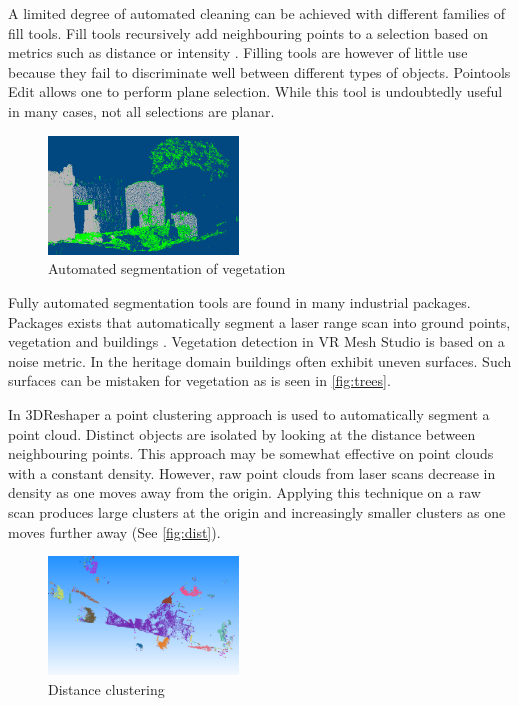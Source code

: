 \documentclass[10pt,twocolumn]{article}
\begin{document}
A limited degree of automated cleaning can be achieved with different families of fill tools. Fill tools recursively add neighbouring points to a selection based on metrics such as distance or intensity \cite{Pointools2012}. Filling tools are however of little use because they fail to discriminate well between different types of objects. Pointools Edit \cite{Pointools2012} allows one to perform plane selection. While this tool is undoubtedly useful in many cases, not all selections are planar.

\begin{figure}[htb]
\centering
\includegraphics[width=0.45\textwidth]{pics/vrmesh-veg.png}
\caption{Automated segmentation of vegetation \cite{VirtualGrid2012}}
\label{fig:trees}
\end{figure}

Fully automated segmentation tools are found in many industrial packages. Packages exists that automatically segment a laser range scan into ground points, vegetation and buildings \cite{Terrasolid2012,VirtualGrid2012,Carlson2012}. Vegetation detection in VR Mesh Studio \cite{Terrasolid2012} is based on a noise metric. In the heritage domain buildings often exhibit uneven surfaces. Such surfaces can be mistaken for vegetation as is seen in \autoref{fig:trees}.

In 3DReshaper \cite{Technodigit2012} a point clustering approach is used to automatically segment a point cloud. Distinct objects are isolated by looking at the distance between neighbouring points. This approach may be somewhat effective on point clouds with a constant density. However, raw point clouds from laser scans decrease in density as one moves away from the origin. Applying this technique on a raw scan produces large clusters at the origin and increasingly smaller clusters as one moves further away (See \autoref{fig:dist}).

\begin{figure}[htb]
\centering
\includegraphics[width=0.45\textwidth]{pics/clustering.png}
\caption{Distance clustering \cite{Technodigit2012}}
\label{fig:dist}
\end{figure}
\end{document}
